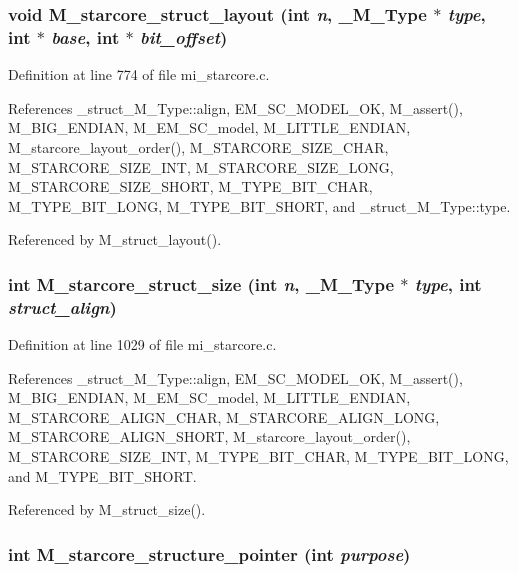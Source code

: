 \subsubsection{\setlength{\rightskip}{0pt plus 5cm}void M\_\-starcore\_\-struct\_\-layout (int {\em n}, \bf{\_\-M\_\-Type} $\ast$ {\em type}, int $\ast$ {\em base}, int $\ast$ {\em bit\_\-offset})}\label{mi__starcore_8c_680fe22170314eada21447c284d1f7a1}




Definition at line 774 of file mi\_\-starcore.c.

References \_\-struct\_\-M\_\-Type::align, EM\_\-SC\_\-MODEL\_\-OK, M\_\-assert(), M\_\-BIG\_\-ENDIAN, M\_\-EM\_\-SC\_\-model, M\_\-LITTLE\_\-ENDIAN, M\_\-starcore\_\-layout\_\-order(), M\_\-STARCORE\_\-SIZE\_\-CHAR, M\_\-STARCORE\_\-SIZE\_\-INT, M\_\-STARCORE\_\-SIZE\_\-LONG, M\_\-STARCORE\_\-SIZE\_\-SHORT, M\_\-TYPE\_\-BIT\_\-CHAR, M\_\-TYPE\_\-BIT\_\-LONG, M\_\-TYPE\_\-BIT\_\-SHORT, and \_\-struct\_\-M\_\-Type::type.

Referenced by M\_\-struct\_\-layout().
\subsubsection{\setlength{\rightskip}{0pt plus 5cm}int M\_\-starcore\_\-struct\_\-size (int {\em n}, \bf{\_\-M\_\-Type} $\ast$ {\em type}, int {\em struct\_\-align})}\label{mi__starcore_8c_25b8e6274747db080cc9fbf1b82d3a25}




Definition at line 1029 of file mi\_\-starcore.c.

References \_\-struct\_\-M\_\-Type::align, EM\_\-SC\_\-MODEL\_\-OK, M\_\-assert(), M\_\-BIG\_\-ENDIAN, M\_\-EM\_\-SC\_\-model, M\_\-LITTLE\_\-ENDIAN, M\_\-STARCORE\_\-ALIGN\_\-CHAR, M\_\-STARCORE\_\-ALIGN\_\-LONG, M\_\-STARCORE\_\-ALIGN\_\-SHORT, M\_\-starcore\_\-layout\_\-order(), M\_\-STARCORE\_\-SIZE\_\-INT, M\_\-TYPE\_\-BIT\_\-CHAR, M\_\-TYPE\_\-BIT\_\-LONG, and M\_\-TYPE\_\-BIT\_\-SHORT.

Referenced by M\_\-struct\_\-size().
\subsubsection{\setlength{\rightskip}{0pt plus 5cm}int M\_\-starcore\_\-structure\_\-pointer (int {\em purpose})}\label{mi__starcore_8c_d82dda30fdcf425e963cd9acfb4a9788}




